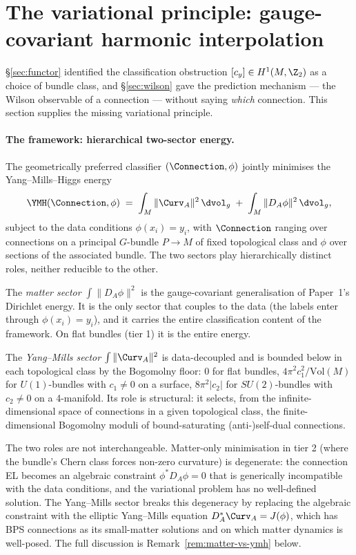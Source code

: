 \section{The variational principle: gauge-covariant harmonic
interpolation}
\label{sec:yang-mills-higgs}

\S\ref{sec:functor} identified the classification obstruction
$[c_y]\in H^1(M,\Z_2)$ as a choice of bundle class, and
\S\ref{sec:wilson} gave the prediction mechanism --- the Wilson
observable of a connection --- without saying \emph{which} connection.
This section supplies the missing variational principle.

\paragraph{The framework: hierarchical two-sector energy.}
The geometrically preferred classifier $(\Connection,\phi)$ jointly
minimises the Yang--Mills--Higgs energy
\[
   \YMH(\Connection,\phi) \;=\;
   \int_M \|\Curv_A\|^2\,\dvol_g
   \;+\;
   \int_M \|D_A\phi\|^2\,\dvol_g,
\]
subject to the data conditions $\phi(x_i)=y_i$, with $\Connection$
ranging over connections on a principal $G$-bundle $P\to M$ of fixed
topological class and $\phi$ over sections of the associated bundle.
The two sectors play hierarchically distinct roles, neither
reducible to the other.

The \emph{matter sector} $\int\|D_A\phi\|^2$ is the gauge-covariant
generalisation of Paper~1's Dirichlet energy. It is the only sector
that couples to the data (the labels enter through $\phi(x_i)=y_i$),
and it carries the entire classification content of the framework.
On flat bundles (tier 1) it is the entire energy.

The \emph{Yang--Mills sector} $\int\|\Curv_A\|^2$ is data-decoupled
and is bounded below in each topological class by the Bogomolny
floor: $0$ for flat bundles, $4\pi^2 c_1^2/\mathrm{Vol}(M)$ for
$U(1)$-bundles with $c_1\neq 0$ on a surface, $8\pi^2|c_2|$ for
$SU(2)$-bundles with $c_2\neq 0$ on a 4-manifold. Its role is
structural: it selects, from the infinite-dimensional space of
connections in a given topological class, the finite-dimensional
Bogomolny moduli of bound-saturating (anti-)self-dual connections.

The two roles are not interchangeable. Matter-only minimisation in
tier 2 (where the bundle's Chern class forces non-zero curvature)
is degenerate: the connection EL becomes an algebraic constraint
$\phi^*D_A\phi=0$ that is generically incompatible with the data
conditions, and the variational problem has no well-defined
solution. The Yang--Mills sector breaks this degeneracy by replacing
the algebraic constraint with the elliptic Yang--Mills equation
$D_A^*\Curv_A=J(\phi)$, which has BPS connections as its small-matter
solutions and on which matter dynamics is well-posed. The full
discussion is Remark~\ref{rem:matter-vs-ymh} below.

